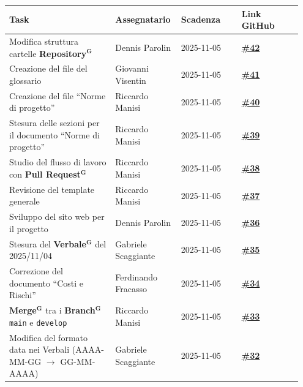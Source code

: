 \documentclass[a4paper,12pt]{article}
\newcommand{\term}[1]{\textbf{#1}$^\mathbf{G}$}
\begin{document}
\begin{center}
    \small
    \renewcommand{\arraystretch}{1.2} 
    \begin{tabular}{|p{0.35\linewidth}|p{0.2\linewidth}|p{0.2\linewidth}|p{0.2\linewidth}|}
        \hline
        \rowcolor{gray!60} 
        \textbf{Task} & \textbf{Assegnatario} & \textbf{Scadenza} & \textbf{Link GitHub} \\
        \hline
        \rowcolor{white}
        Modifica struttura cartelle \term{Repository} & Dennis Parolin & 2025-11-05 & \href{https://github.com/SWE-BitByBit/SWE-project/issues/42}{\textbf{\#42}} \\
        \hline
        \rowcolor{gray!20}
        Creazione del file del glossario & Giovanni Visentin & 2025-11-05 & \href{https://github.com/SWE-BitByBit/SWE-project/issues/41}{\textbf{\#41}} \\
        \hline
        \rowcolor{white}
        Creazione del file “Norme di progetto” & Riccardo Manisi & 2025-11-05 & \href{https://github.com/SWE-BitByBit/SWE-project/issues/40}{\textbf{\#40}} \\
        \hline
        \rowcolor{gray!20}
        Stesura delle sezioni per il documento “Norme di progetto” & Riccardo Manisi & 2025-11-05 & \href{https://github.com/SWE-BitByBit/SWE-project/issues/39}{\textbf{\#39}} \\
        \hline
        \rowcolor{white}
        Studio del flusso di lavoro con \term{Pull Request} & Riccardo Manisi & 2025-11-05 & \href{https://github.com/SWE-BitByBit/SWE-project/issues/38}{\textbf{\#38}} \\
        \hline
        \rowcolor{gray!20}
        Revisione del template generale & Riccardo Manisi & 2025-11-05 & \href{https://github.com/SWE-BitByBit/SWE-project/issues/37}{\textbf{\#37}} \\
        \hline
        \rowcolor{white}
        Sviluppo del sito web per il progetto & Dennis Parolin & 2025-11-05 & \href{https://github.com/SWE-BitByBit/SWE-project/issues/36}{\textbf{\#36}} \\
        \hline
        \rowcolor{gray!20}
        Stesura del \term{Verbale} del 2025/11/04 & Gabriele Scaggiante & 2025-11-05 & \href{https://github.com/SWE-BitByBit/SWE-project/issues/35}{\textbf{\#35}} \\
        \hline
        \rowcolor{white}
        Correzione del documento “Costi e Rischi” & Ferdinando Fracasso & 2025-11-05 & \href{https://github.com/SWE-BitByBit/SWE-project/issues/34}{\textbf{\#34}} \\
        \hline
        \rowcolor{gray!20}
        \term{Merge} tra i \term{Branch} \texttt{main} e \texttt{develop} & Riccardo Manisi & 2025-11-05 & \href{https://github.com/SWE-BitByBit/SWE-project/issues/33}{\textbf{\#33}} \\
        \hline
        \rowcolor{white}
        Modifica del formato data nei Verbali (AAAA-MM-GG $\rightarrow$ GG-MM-AAAA) & Gabriele Scaggiante & 2025-11-05 & \href{https://github.com/SWE-BitByBit/SWE-project/issues/32}{\textbf{\#32}} \\
        \hline
    \end{tabular}
\end{center}
\end{document}
